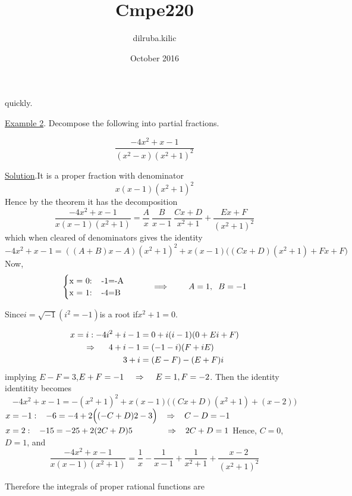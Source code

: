 \documentclass{article}
\title{Cmpe220}
\author{dilruba.kilic }
\date{October 2016}
\begin{document}

\noindent quickly.
\par \underline{Example 2}. Decompose the following into partial fractions.

$$
\frac{-4x^2 +x -1}{(x^2 -x)(x^2 + 1)^2}
$$

\par \underline{Solution}.It is a proper fraction with denominator
$$
x(x-1)(x^2 +1)^2
$$
Hence by the theorem it has the decomposition
$$
\frac{-4x^2 +x -1}{x(x-1)(x^2 +1)} =
\frac{A}{x} \ \frac{B}{x-1} \ \frac{Cx+D}{x^2 + 1} + \frac{Ex+F}{(x^2 +1)^2}
$$
which when cleared of denominators gives the identity
$$      
-4x^2 +x -1 = ((A+B)x -A)(x^2 +1)^2 +x(x-1)\Big((Cx+D)(x^2+1)+Fx +F\Big)
$$
Now,
\begin{equation*}
  \begin{cases}
    $x = 0:$ \hspace{4mm} $-1=-A$\\
    $x = 1:$ \hspace{4mm} $-4=B$
  \end{cases}
  \qquad\implies\qquad
    A =1,\hspace{2mm}B=-1
\end{equation*}



\par Since\hspace{4mm}$i= \sqrt{-1}$\hspace{2mm}$(i^2 = -1)$\hspace{4mm}is a root if\hspace{4mm}$x^2 +1 = 0$.

\begin{equation*}
    \begin{split}
         x = i: -4i^2 +i -1 &= 0 +i(i-1)(0+ Ei+ F)\\
        \Rightarrow \hspace{5mm} 4 + i - 1 &= (-1 - i)(F + iE)\\
        3 + i &= (E-F) - (E + F)i
    \end{split}
\end{equation*}
implying $E - F = 3$,\hspace{3mm}$E+F =-1 \hspace{4mm}\Rightarrow \hspace{4mm} E=1,  F=-2$. 
Then the identity \newline
identitity becomes
$$
-4x^2 +x -1 =  -(x^2 +1)^2 + x(x-1)\Big((Cx + D)(x^2 +1)+(x-2)\Big)
$$
$x = -1: \hspace{3mm} -6 = -4 +2\Big((-C +D)2 -3\Big) \hspace{3mm} \Rightarrow \hspace{3mm} C - D = -1$
\newline
$x = 2: \hspace{3mm} -15 = -25 + 2(2C + D)5 \hspace{14mm} \Rightarrow \hspace{3mm} 2C + D = 1$
\medskip
\newline
Hence, $C=0$, $D=1$, and
$$
\frac{-4x^2 +x -1}{x(x-1)(x^2 +1)} = \frac{1}{x} - \frac{1}{x-1} + \frac{1}{x^2 + 1} + \frac{x-2}{(x^2 +1)^2}
$$

Therefore the integrals of proper rational functions are
\end{document}
